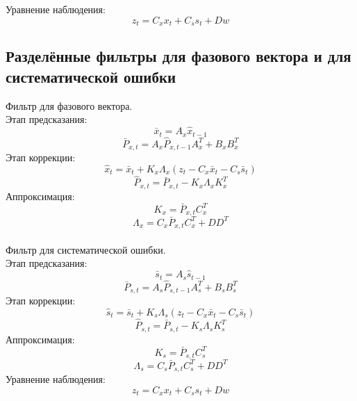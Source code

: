 Уравнение наблюдения:
\[z_{t} = C_{x}x_{t} + C_{s}s_{t} + Dw\]

\newpage

\subsection{Разделённые фильтры для фазового вектора и для систематической ошибки}
\noindent Фильтр для фазового вектора. \\


\noindent Этап предсказания:
\[\bar{x}_{t} = A_{x}\hat{x}_{t-1} \]
\[\bar{P}_{x,t} = A_{x}\hat{P}_{x,t-1}A_{x}^T + B_{x}B_{x}^T\]
Этап коррекции:
\[\hat{x}_{t} = \bar{x}_{t} + K_{x}\Lambda_{x}(z_{t} - C_{x}\bar{x}_{t} - C_{s}\bar{s}_{t})\]
\[\hat{P}_{x,t} = \bar{P}_{x,t} - K_{x}\Lambda_{x} K_{x}^T\] 
Аппроксимация:
\[K_{x} = \bar{P}_{x,t}C_{x}^T \]
\[\Lambda_{x} = C_{x}\bar{P}_{x,t}C_{x}^T + DD^T\] \\
Фильтр для систематической ошибки. \\


\noindent Этап предсказания:
\[\bar{s}_{t} = A_{s}\hat{s}_{t-1} \]
\[\bar{P}_{s,t} = A_{s}\hat{P}_{s,t-1}A_{s}^T + B_{s}B_{s}^T\]
Этап коррекции:
\[\hat{s}_{t} = \bar{s}_{t} + K_{s}\Lambda_{s}(z_{t} - C_{x}\bar{x}_{t} - C_{s}\bar{s}_{t})\]
\[\hat{P}_{s,t} = \bar{P}_{s,t} - K_{s}\Lambda_{s} K_{s}^T\]
Аппроксимация:
\[K_{s} = \bar{P}_{s,t}C_{s}^T \]
\[\Lambda_{s} = C_{s}\bar{P}_{s,t}C_{s}^T + DD^T\]
Уравнение наблюдения:
\[z_{t} = C_{x}x_{t} + C_{s}s_{t} + Dw\]

